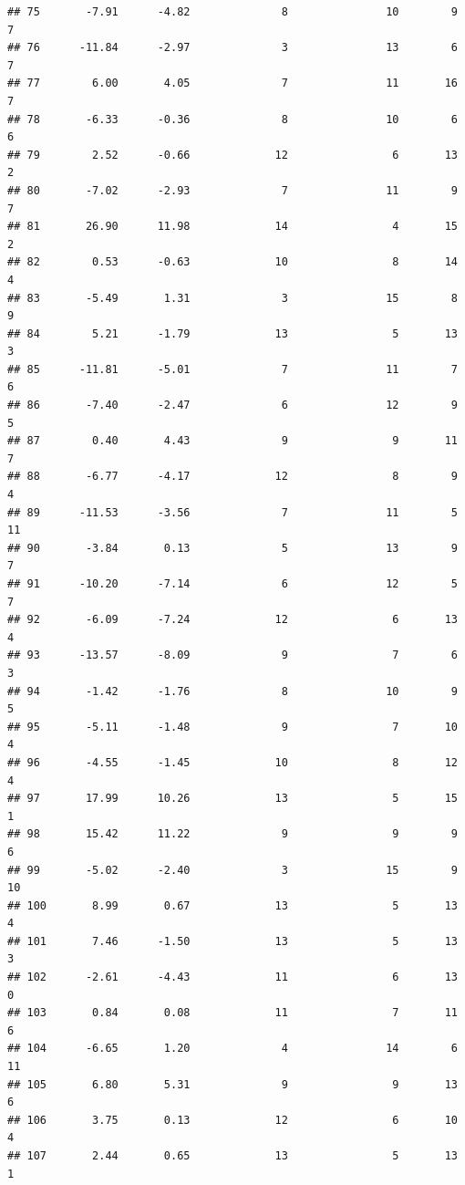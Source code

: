 \documentclass[]{book}
\begin{document}
\begin{verbatim}
## 75       -7.91      -4.82              8               10        9          7
## 76      -11.84      -2.97              3               13        6          7
## 77        6.00       4.05              7               11       16          7
## 78       -6.33      -0.36              8               10        6          6
## 79        2.52      -0.66             12                6       13          2
## 80       -7.02      -2.93              7               11        9          7
## 81       26.90      11.98             14                4       15          2
## 82        0.53      -0.63             10                8       14          4
## 83       -5.49       1.31              3               15        8          9
## 84        5.21      -1.79             13                5       13          3
## 85      -11.81      -5.01              7               11        7          6
## 86       -7.40      -2.47              6               12        9          5
## 87        0.40       4.43              9                9       11          7
## 88       -6.77      -4.17             12                8        9          4
## 89      -11.53      -3.56              7               11        5         11
## 90       -3.84       0.13              5               13        9          7
## 91      -10.20      -7.14              6               12        5          7
## 92       -6.09      -7.24             12                6       13          4
## 93      -13.57      -8.09              9                7        6          3
## 94       -1.42      -1.76              8               10        9          5
## 95       -5.11      -1.48              9                7       10          4
## 96       -4.55      -1.45             10                8       12          4
## 97       17.99      10.26             13                5       15          1
## 98       15.42      11.22              9                9        9          6
## 99       -5.02      -2.40              3               15        9         10
## 100       8.99       0.67             13                5       13          4
## 101       7.46      -1.50             13                5       13          3
## 102      -2.61      -4.43             11                6       13          0
## 103       0.84       0.08             11                7       11          6
## 104      -6.65       1.20              4               14        6         11
## 105       6.80       5.31              9                9       13          6
## 106       3.75       0.13             12                6       10          4
## 107       2.44       0.65             13                5       13          1

\end{verbatim}
\end{document}
